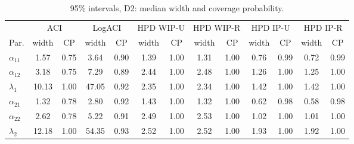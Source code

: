 \documentclass[a4paper,11pt]{article}
\begin{document}
\begin{table}[htbp]
\centering\small\setlength{\tabcolsep}{3.5pt}
\caption{95\% intervals, D2: median width and coverage probability.}\label{tab:int}
\begin{tabular}{lcccccccccccc}
\hline
 & \multicolumn{2}{c}{ACI} & \multicolumn{2}{c}{LogACI} & \multicolumn{2}{c}{HPD WIP-U} & \multicolumn{2}{c}{HPD WIP-R} & \multicolumn{2}{c}{HPD IP-U} & \multicolumn{2}{c}{HPD IP-R}\\
Par. & width & CP & width & CP & width & CP & width & CP & width & CP & width & CP\\\hline
$\alpha_{11}$ & 1.57 & 0.75 & 3.64 & 0.90 & 1.39 & 1.00 & 1.31 & 1.00 & 0.76 & 0.99 & 0.72 & 0.99\\
$\alpha_{12}$ & 3.18 & 0.75 & 7.29 & 0.89 & 2.44 & 1.00 & 2.48 & 1.00 & 1.26 & 1.00 & 1.25 & 1.00\\
$\lambda_1$ & 10.13 & 1.00 & 47.05 & 0.92 & 2.35 & 1.00 & 2.34 & 1.00 & 1.42 & 1.00 & 1.42 & 1.00\\
$\alpha_{21}$ & 1.32 & 0.78 & 2.80 & 0.92 & 1.43 & 1.00 & 1.32 & 1.00 & 0.62 & 0.98 & 0.58 & 0.98\\
$\alpha_{22}$ & 2.62 & 0.78 & 5.22 & 0.91 & 2.49 & 1.00 & 2.53 & 1.00 & 1.02 & 1.00 & 1.01 & 1.00\\
$\lambda_2$ & 12.18 & 1.00 & 54.35 & 0.93 & 2.52 & 1.00 & 2.52 & 1.00 & 1.93 & 1.00 & 1.92 & 1.00\\\hline
\end{tabular}
\end{table}

\begin{table}[htbp]
\centering\small\setlength{\tabcolsep}{4pt}
\caption{Effect of the order restriction (D2; average over the four shape parameters): MSE of the SE Bayes estimate, median HPD width and HPD coverage, unrestricted (U) versus restricted (R).}\label{tab:restr}
\end{table}
\end{document}
